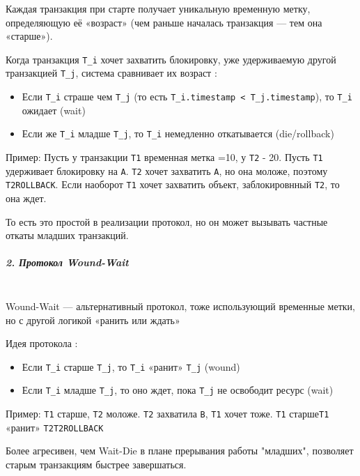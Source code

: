  Каждая транзакция при старте получает уникальную временную метку, определяющую её «возраст» (чем раньше началась транзакция — тем она «старше»).
 
 Когда транзакция \texttt{T\_i} хочет захватить блокировку, уже удерживаемую другой транзакцией \texttt{T\_j}, система сравнивает их возраст \autocite{Silberschatz, ElmasriNavathe}:
 \begin{itemize}
     \item Если \texttt{T\_i} страше чем \texttt{T\_j} (то есть \texttt{T\_i.timestamp < T\_j.timestamp}), то \texttt{T\_i} ожидает (wait)
     \item Если же \texttt{T\_i} младше \texttt{T\_j}, то \texttt{T\_i} немедленно откатывается (die/rollback)
 \end{itemize}
 
 Пример:
 Пусть у транзакции \texttt{T1} временная метка =10, у \texttt{T2} - 20. Пусть \texttt{T1} удерживает блокировку на \texttt{A}. \texttt{T2} хочет захватить \texttt{A}, но она моложе, поэтому \texttt{T2\textrightarrow ROLLBACK}. Если наоборот \texttt{T1} хочет захватить объект, заблокировнный \texttt{T2}, то она ждет.
 
 То есть это простой в реализации протокол, но он может вызывать частные откаты младших транзакций.
 
 \subparagraph{2. Протокол Wound-Wait} ~\\
 
 Wound-Wait — альтернативный протокол, тоже использующий временные метки, но с другой логикой «ранить или ждать»
 
 Идея протокола \autocite{Silberschatz, ElmasriNavathe}:
 \begin{itemize}
     \item Если \texttt{T\_i} старше \texttt{T\_j}, то \texttt{T\_i} «ранит» \texttt{T\_j} (wound)
     \item Если \texttt{T\_i} младше \texttt{T\_j}, то оно ждет, пока \texttt{T\_j} не освободит ресурс (wait)
 \end{itemize}
 
 Пример:
 \texttt{T1} старше, \texttt{T2} моложе. \texttt{T2} захватила \texttt{B}, \texttt{T1} хочет тоже. \texttt{T1} старше\textrightarrow \texttt{T1} «ранит» \texttt{T2}\textrightarrow \texttt{T2\textrightarrow ROLLBACK} 
 
 Более агресивен, чем Wait-Die в плане прерывания работы "младших", позволяет старым транзакциям быстрее завершаться.
 
